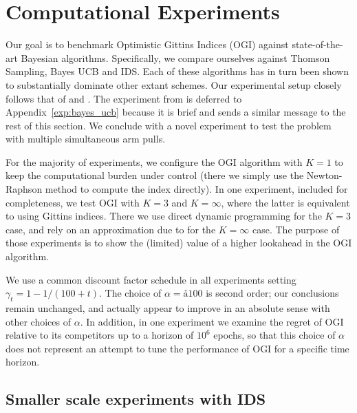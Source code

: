 \section{Computational Experiments} \label{sec:experiments}
Our goal is to benchmark Optimistic Gittins Indices (OGI) against state-of-the-art Bayesian algorithms. Specifically, we compare ourselves against Thomson Sampling, Bayes UCB and IDS. Each of these algorithms has in turn been shown to substantially dominate other extant schemes. Our experimental setup closely follows that of \cite{russo2014learning,kaufmann2012bayesian} and \cite{chapelle2011empirical}. 
The experiment from \cite{kaufmann2012bayesian} is deferred to Appendix~\ref{exp:bayes_ucb} because it is brief and sends a similar message to the rest of this section. We conclude with a novel experiment to test the problem with multiple simultaneous arm pulls.

For the majority of experiments, we configure the OGI algorithm with $K =1$ to keep the computational burden under control {\color{blue} (there we simply use the Newton-Raphson method to compute the index directly)}. In one experiment, included for completeness, we test OGI with $K = 3$ and $K=\infty$, where the latter is equivalent to using Gittins indices. {\color{blue} There we use direct dynamic programming for the $K=3$ case, and rely on an approximation due to \cite{powell2012optimal} for the $K=\infty$ case.} The purpose of those experiments is to show the (limited) value of a higher lookahead in the OGI algorithm. 

We use a common discount factor schedule in all experiments setting $\gamma_t = 1 - 1/(100 + t)$. The choice of $\alpha =å 100$ is second order; our conclusions remain unchanged, and actually appear to improve in an absolute sense with other choices of $\alpha$. In addition, in one experiment we examine the regret of OGI relative to its competitors up to a horizon of $10^6$ epochs, so that this choice of $\alpha$ does not represent an attempt to tune the performance of OGI for a specific time horizon. 



\subsection{Smaller scale experiments with IDS}

